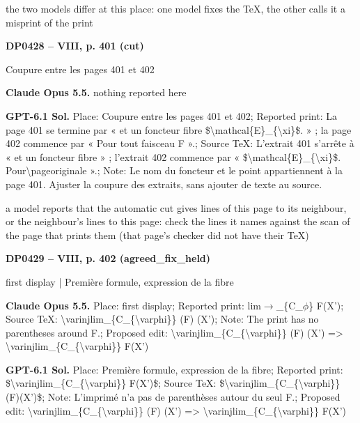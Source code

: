 the two models differ at this place: one model fixes the TeX, the other calls it a misprint of the print\par
\par\noindent\hypertarget{DP0428}{}\textbf{DP0428 -- VIII, p. 401 (cut)}\par
Coupure entre les pages 401 et 402\par
\textbf{Claude Opus 5.5.} nothing reported here\par
\textbf{GPT-6.1 Sol.} Place: Coupure entre les pages 401 et 402; Reported print: La page 401 se termine par « et un foncteur fibre \$\textbackslash{}mathcal\{E\}\_\{\textbackslash{}xi\}\$. » ; la page 402 commence par « Pour tout faisceau F ».; Source TeX: L'extrait 401 s'arrête à « et un foncteur fibre » ; l'extrait 402 commence par « \$\textbackslash{}mathcal\{E\}\_\{\textbackslash{}xi\}\$. Pour\textbackslash{}pageoriginale ».; Note: Le nom du foncteur et le point appartiennent à la page 401. Ajuster la coupure des extraits, sans ajouter de texte au source.\par
a model reports that the automatic cut gives lines of this page to its neighbour, or the neighbour's lines to this page: check the lines it names against the scan of the page that prints them (that page's checker did not have their TeX)\par
\par\noindent\hypertarget{DP0429}{}\textbf{DP0429 -- VIII, p. 402 (agreed\_fix\_held)}\par
first display | Première formule, expression de la fibre\par
\textbf{Claude Opus 5.5.} Place: first display; Reported print: lim\ensuremath{\to}\_\{C\_\ensuremath{\phi}\} F(X'); Source TeX: \textbackslash{}varinjlim\_\{C\_\{\textbackslash{}varphi\}\} (F) (X'); Note: The print has no parentheses around F.; Proposed edit: \textbackslash{}varinjlim\_\{C\_\{\textbackslash{}varphi\}\} (F) (X') =\allowbreak > \textbackslash{}varinjlim\_\{C\_\{\textbackslash{}varphi\}\} F(X')\par
\textbf{GPT-6.1 Sol.} Place: Première formule, expression de la fibre; Reported print: \$\textbackslash{}varinjlim\_\{C\_\{\textbackslash{}varphi\}\} F(X')\$; Source TeX: \$\textbackslash{}varinjlim\_\{C\_\{\textbackslash{}varphi\}\} (F)(X')\$; Note: L'imprimé n'a pas de parenthèses autour du seul F.; Proposed edit: \textbackslash{}varinjlim\_\{C\_\{\textbackslash{}varphi\}\} (F) (X') =\allowbreak > \textbackslash{}varinjlim\_\{C\_\{\textbackslash{}varphi\}\} F(X')\par
